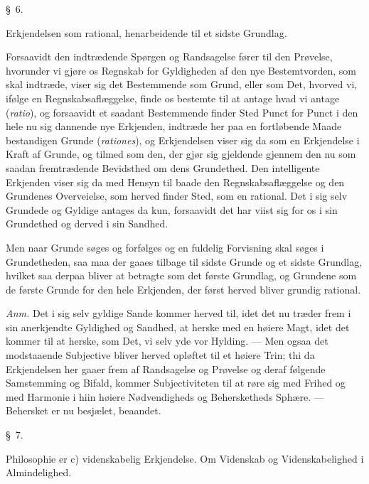 \documentclass[12pt,a4paper]{book}
\newcommand{\apage}[1]{\marginnote{\footnotesize\textit{[#1]}}}
\begin{document}
\begin{center}\large\S~6.\end{center}
\begin{center}Erkjendelsen som rational, henarbeidende til et sidste Grundlag.\end{center}

Forsaavidt den indtrædende Spørgen og Randsagelse  \apage{21} fører til den Prøvelse,
hvorunder vi gjøre os Regnskab for Gyldigheden af den nye Bestemtvorden, som skal
indtræde, viser sig det Bestemmende som Grund, eller som Det, hvorved vi, ifølge
en Regnskabsaflæggelse, finde os bestemte til at antage hvad vi antage
(\textit{ratio}), og forsaavidt et saadant Bestemmende finder Sted Punct for
Punct i den hele nu sig dannende nye Erkjenden, indtræde her paa en fortløbende
Maade bestandigen Grunde (\textit{rationes}), og Erkjendelsen viser sig da som en
Erkjendelse i Kraft af Grunde, og tilmed som den, der gjør sig gjeldende gjennem
den nu som saadan fremtrædende Bevidsthed om dens Grundethed. Den intelligente
Erkjenden viser sig da med Hensyn til baade den Regnskabsaflæggelse og den
Grundenes Overveielse, som herved finder Sted, som en rational. Det i sig selv
Grundede og Gyldige antages da kun, forsaavidt det har viist sig for os i sin
Grundethed og derved i sin Sandhed.

Men naar Grunde søges og forfølges og en fuldelig Forvisning skal søges i
Grundetheden, saa maa der gaaes tilbage til sidste Grunde og et sidste Grundlag,
hvilket saa derpaa bliver at betragte som det første Grundlag, og Grundene som de
første Grunde for den hele Erkjenden, der først herved bliver grundig rational.

{\small\emph{Anm.} Det i sig selv gyldige Sande kommer herved til, idet det nu
træder frem i sin anerkjendte Gyldighed og Sandhed, at herske med en høiere Magt,
idet det kommer til at herske, som Det, vi selv yde vor Hylding. --- Men ogsaa
det modstaaende Subjective bliver herved opløftet til et høiere Trin; thi da
Erkjendelsen her gaaer frem af Randsagelse og Prøvelse og deraf følgende
Samstemming og Bifald, kommer Subjectiviteten til at røre sig med Frihed og med
Harmonie i hiin høiere Nødvendigheds og Behersketheds Sphære. --- Behersket er nu
besjælet, beaandet.\par} \apage{22} 

\begin{center}\large\S~7.\end{center}
\begin{center}Philosophie er c) videnskabelig Erkjendelse. Om Videnskab og
Videnskabelighed i Almindelighed.\end{center}
\end{document}
